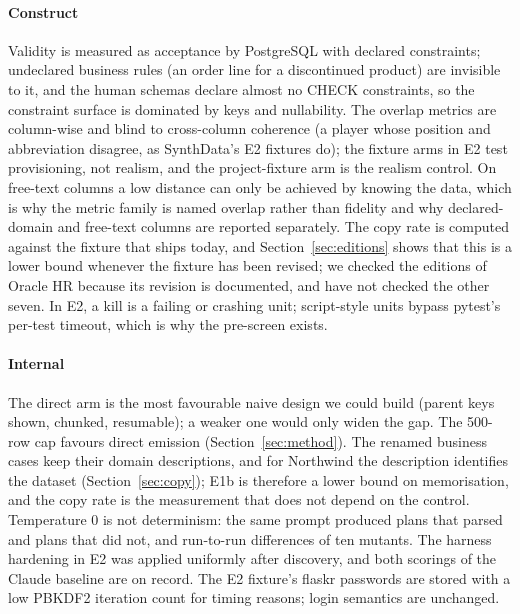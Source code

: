 \documentclass[preprint,12pt]{elsarticle}
\begin{document}
\paragraph{Construct} Validity is measured as acceptance by PostgreSQL with declared constraints; undeclared business rules (an order line for a discontinued product) are invisible to it, and the human schemas declare almost no CHECK constraints, so the constraint surface is dominated by keys and nullability. The overlap metrics are column-wise and blind to cross-column coherence (a player whose position and abbreviation disagree, as SynthData's E2 fixtures do); the fixture arms in E2 test provisioning, not realism, and the project-fixture arm is the realism control. On free-text columns a low distance can only be achieved by knowing the data, which is why the metric family is named overlap rather than fidelity and why declared-domain and free-text columns are reported separately. The copy rate is computed against the fixture that ships today, and Section~\ref{sec:editions} shows that this is a lower bound whenever the fixture has been revised; we checked the editions of Oracle HR because its revision is documented, and have not checked the other seven. In E2, a kill is a failing or crashing unit; script-style units bypass pytest's per-test timeout, which is why the pre-screen exists.
\paragraph{Internal} The direct arm is the most favourable naive design we could build (parent keys shown, chunked, resumable); a weaker one would only widen the gap. The 500-row cap favours direct emission (Section~\ref{sec:method}). The renamed business cases keep their domain descriptions, and for Northwind the description identifies the dataset (Section~\ref{sec:copy}); E1b is therefore a lower bound on memorisation, and the copy rate is the measurement that does not depend on the control. Temperature 0 is not determinism: the same prompt produced plans that parsed and plans that did not, and run-to-run differences of ten mutants. The harness hardening in E2 was applied uniformly after discovery, and both scorings of the Claude baseline are on record. The E2 fixture's flaskr passwords are stored with a low PBKDF2 iteration count for timing reasons; login semantics are unchanged.
\end{document}
